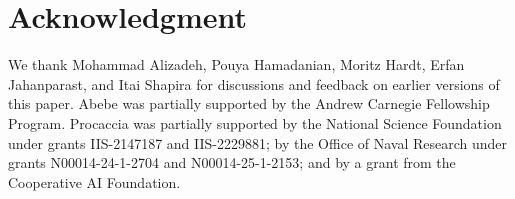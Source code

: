\section*{Acknowledgment}
We thank Mohammad Alizadeh, Pouya Hamadanian, Moritz Hardt, Erfan Jahanparast, and Itai Shapira for discussions and feedback on earlier versions of this paper. Abebe was partially supported by the Andrew Carnegie Fellowship Program. 
Procaccia was partially supported by the National Science Foundation under grants IIS-2147187 and IIS-2229881; by the Office of Naval Research under grants N00014-24-1-2704 and N00014-25-1-2153; and by a grant from the Cooperative AI Foundation. 